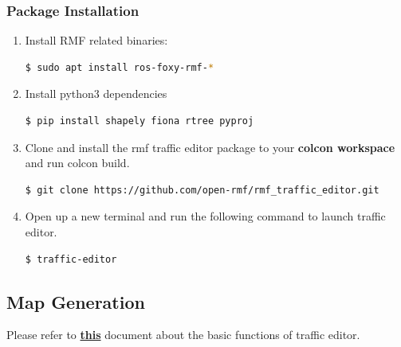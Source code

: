 \documentclass[11pt]{article}
\begin{document}
\subsubsection{Package Installation}
\begin{enumerate}
 \item {
       Install RMF related binaries:
       
       \begin{lstlisting}[language=bash]
         $ sudo apt install ros-foxy-rmf-*
          \end{lstlisting}
       }
 \item{
       Install python3 dependencies
       \begin{lstlisting}[language=bash]
         $ pip install shapely fiona rtree pyproj
        \end{lstlisting}
       }
 \item {
       Clone and install the rmf traffic editor package to your \textbf{colcon workspace} and run colcon build.
       \begin{lstlisting}[language=bash]
         $ git clone https://github.com/open-rmf/rmf_traffic_editor.git
        \end{lstlisting}
       
       }
 \item {
       Open up a new terminal and run the following command to launch traffic editor.
       \begin{lstlisting}[language=bash]
         $ traffic-editor
        \end{lstlisting}
       }
\end{enumerate}
\subsection{Map Generation}
Please refer to
\href{ https://osrf.github.io/ros2multirobotbook/traffic-editor.html}{\textbf{this}} document about the basic functions of traffic editor.
\end{document}
